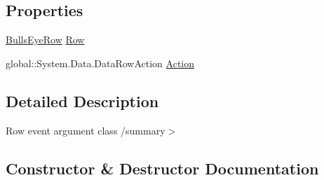 \subsection*{Properties}
\begin{DoxyCompactItemize}
\item 
\hyperlink{class_env_int_1_1_win32_1_1_field_tech_1_1_manager_1_1_data_sets_1_1_guide_ware_mobile_data_set_1_1_bulls_eye_row}{Bulls\+Eye\+Row} \hyperlink{class_env_int_1_1_win32_1_1_field_tech_1_1_manager_1_1_data_sets_1_1_guide_ware_mobile_data_set_1_1_bulls_eye_row_change_event_ad9cca333cb49d78750996972524d965e}{Row}
\item 
global\+::\+System.\+Data.\+Data\+Row\+Action \hyperlink{class_env_int_1_1_win32_1_1_field_tech_1_1_manager_1_1_data_sets_1_1_guide_ware_mobile_data_set_1_1_bulls_eye_row_change_event_af0e3b6f0e5d5518cbe7b313624d85255}{Action}
\end{DoxyCompactItemize}


\subsection{Detailed Description}
Row event argument class /summary$>$ 

\subsection{Constructor \& Destructor Documentation}
\hypertarget{class_env_int_1_1_win32_1_1_field_tech_1_1_manager_1_1_data_sets_1_1_guide_ware_mobile_data_set_1_1_bulls_eye_row_change_event_a20d28b9e5399d694d672f08d3a6bc72c}{}
